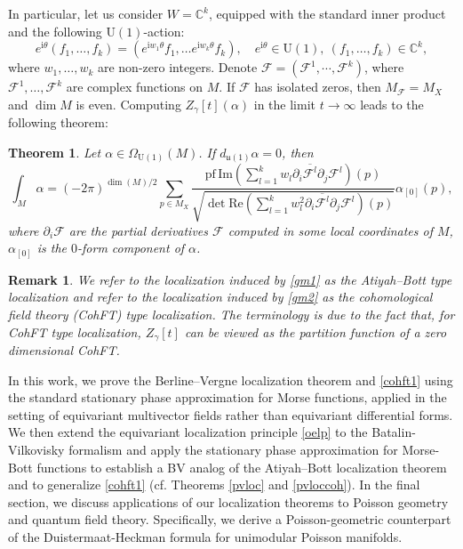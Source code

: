 \documentclass[12pt]{amsart}
\numberwithin{table}{section}
\numberwithin{equation}{section}
\newtheorem{rmk}{Remark}[section]
\newtheorem{thm}{Theorem}[section]
\theoremstyle{plain}
\newcommand{\C}{\mathbb{C}}
\newcommand{\U}{\mathrm{U}}
\newcommand{\ut}{\mathfrak{u}}
\newcommand{\sF}{\mathcal{F}}
\newcommand{\pf}{\mathrm{pf}\,}
\begin{document}
\begin{itemize}
	In particular, let us consider $W=\C^k$, equipped with the standard inner product and the following $\U(1)$-action:
	\[
	e^{\mathrm{i}\theta}(f_1, \dots, f_k) = (e^{\mathrm{i}w_1\theta}f_1, \dots e^{\mathrm{i}w_k\theta}f_k), \quad e^{\mathrm{i}\theta} \in \U(1),~ (f_1, \dots, f_k) \in \C^k,
	\]
	where $w_1, \dots, w_k$ are non-zero integers. Denote $\sF=(\sF^1, \cdots, \sF^k)$, where $\sF^1, \dots, \sF^k$ are complex functions on $M$. If $\sF$ has isolated zeros, then $M_{\sF} = M_{X}$ and $\dim M$ is even. Computing $Z_{\gamma}[t](\alpha)$ in the limit $t \to \infty$ leads to the following theorem:
	\begin{thm}
		Let $\alpha \in \Omega_{\U(1)}(M)$.  If $d_{\ut(1)} \alpha = 0$, then
		\begin{equation}\label{cohft1}
			\int_M \alpha = (-2\pi)^{\dim(M)/2} \sum_{p \in M_{X}} \frac{\pf \mathrm{Im} (\sum_{l=1}^k w_l \partial_i \overline{\sF^l} \partial_j \sF^l)(p)}{\sqrt{\det \mathrm{Re} (\sum_{l=1}^k w_l^2 \partial_i \overline{\sF^l} \partial_j \sF^l)(p)}} \alpha_{[0]}(p),
		\end{equation}
		where $\partial_i \sF$ are the partial derivatives $\sF$ computed in some local coordinates of $M$, $\alpha_{[0]}$ is the $0$-form component of $\alpha$.
	\end{thm}
\end{itemize}
\begin{rmk}
	We refer to the localization induced by \eqref{gm1} as the Atiyah--Bott type localization and refer to the localization induced by \eqref{gm2} as the cohomological field theory (CohFT) type localization. The terminology is due to the fact that, for CohFT type localization, $Z_{\gamma}[t]$ can be viewed as the partition function of a zero dimensional CohFT. 
\end{rmk}

In this work, we prove the Berline--Vergne localization theorem and \eqref{cohft1} using the standard stationary phase approximation for Morse functions, applied in the setting of equivariant multivector fields rather than equivariant differential forms. We then extend the equivariant localization principle \eqref{oelp} to the Batalin-Vilkovisky formalism and apply the stationary phase approximation for Morse-Bott functions to establish a BV analog of the Atiyah--Bott localization theorem and to generalize \eqref{cohft1} (cf. Theorems \ref{pvloc} and \ref{pvloccoh}). In the final section, we discuss applications of our localization theorems to Poisson geometry and quantum field theory. Specifically, we derive a Poisson-geometric counterpart of the Duistermaat-Heckman formula \cite{duistermaat1982variation} for unimodular Poisson manifolds.
\end{document}

